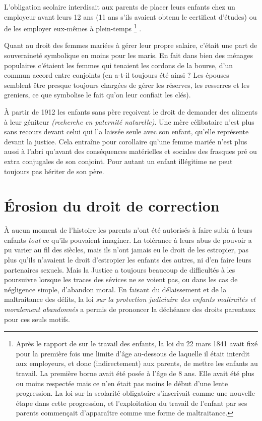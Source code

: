  L'obligation scolaire interdisait aux parents de placer leurs enfants chez un employeur avant leurs 12 ans (11 ans s'ils avaient obtenu le certificat d'études) ou de les employer eux-mêmes à plein-temps%
\footnote{Après le rapport de  sur le travail des enfants, la loi du 22 mars 1841 avait fixé pour la première fois une limite d'âge au-dessous de laquelle il était interdit aux employeurs, et donc (indirectement) aux parents, de mettre les enfants au travail. La première borne avait été posée à l'âge de 8 ans. Elle avait été plus ou moins respectée mais ce n'en était pas moins le début d'une lente progression. La loi sur la scolarité obligatoire s'inscrivait comme une nouvelle étape dans cette progression, et l'exploitation du travail de l'enfant par ses parents commençait d'apparaître comme une forme de maltraitance.}%
. 

 Quant au droit des femmes mariées à gérer leur propre salaire, c'était une part de souveraineté symbolique en moins pour les maris. En fait dans bien des ménages populaires c'étaient les femmes qui tenaient les cordons de la bourse, d'un commun accord entre conjoints (en a-t-il toujours été ainsi ? Les épouses semblent être presque toujours chargées de gérer les réserves, les resserres et les greniers, ce que symbolise le fait qu'on leur confiait les clés).

 À partir de 1912 les enfants sans père reçoivent le droit de demander des aliments à leur géniteur \emph{(recherche en paternité naturelle)}. Une mère célibataire n'est plus sans recours devant celui qui l'a laissée seule avec son enfant, qu'elle représente devant la justice. Cela entraîne pour corollaire qu'une femme mariée n'est plus aussi à l'abri qu'avant des conséquences matérielles et sociales des frasques pré ou extra conjugales de son conjoint. Pour autant un enfant illégitime ne peut toujours pas hériter de son père. 


\section{Érosion du droit de correction}

 À aucun moment de l'histoire les parents n'ont été autorisés à faire subir à leurs enfants \emph{tout} ce qu'ils pouvaient imaginer. La tolérance à leurs abus de pouvoir a pu varier au fil des siècles, mais ils n'ont jamais eu le droit de les estropier, pas plus qu'ils n'avaient le droit d'estropier les enfants des autres, ni d'en faire leurs partenaires sexuels. Mais la Justice a toujours beaucoup de difficultés à les poursuivre lorsque les traces des sévices ne se voient pas, ou dans les cas de négligence simple, d'abandon moral. En faisant du délaissement et de la maltraitance des délits, la loi {\emph{sur la protection judiciaire des enfants maltraités et moralement abandonnés}} a permis de prononcer la déchéance des droits parentaux pour ces seuls motifs. 

